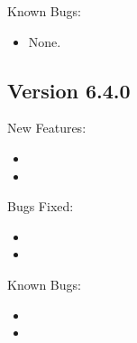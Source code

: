 \noindent Known Bugs:
\begin{itemize}

\item None.

\end{itemize}

\subsection{\label{sec:New-6-4-0}Version 6.4.0}
\noindent New Features:
\begin{itemize}

\item 

\item 

\end{itemize}

\noindent Bugs Fixed:
\begin{itemize}

\item 

\item 

\end{itemize}

\noindent Known Bugs:
\begin{itemize}
\item 

\item 

\end{itemize}



